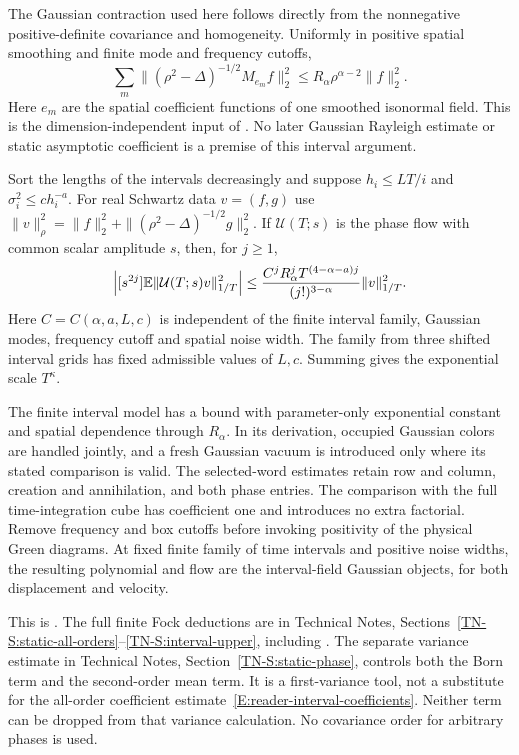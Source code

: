 The Gaussian contraction used here follows directly from the nonnegative
positive-definite covariance and homogeneity. Uniformly in positive spatial
smoothing and finite mode and frequency cutoffs,
\[
  \sum_m\|(\rho^2-\Delta)^{-1/2}M_{e_m}f\|_2^2
  \le R_\alpha\rho^{\alpha-2}\|f\|_2^2.
\]
Here $e_m$ are the spatial coefficient functions of one smoothed isonormal
field. This is the dimension-independent input of
. No later Gaussian Rayleigh estimate or
static asymptotic coefficient is a premise of this interval argument.

\begin{lemma}
  \label{L:reader-finite-upper}
  Sort the lengths of the intervals decreasingly and suppose $h_i \le LT/i$ and
  $\sigma_i^2 \le c h_i^{-a}$. For real Schwartz data $v = (f,g)$ use
  $\|v\|_\rho^2 = \|f\|_2^2+\|(\rho^2-\Delta)^{-1/2}g\|_2^2$. If
  $\mathcal{U}(T;s)$ is the phase flow with common scalar amplitude $s$, then,
  for $j \ge 1$,
  \begin{equation}\label{E:reader-interval-coefficients}
    \left|[s^{2j}]\mathbb E\|\mathcal{U}(T;s)v\|_{1/T}^2\right|
    \le\frac{C^jR_\alpha^jT^{(4-\alpha-a)j}}{(j!)^{3-\alpha}}
    \|v\|_{1/T}^2.
  \end{equation}
  Here $C = C(\alpha,a,L,c)$ is independent of the finite interval family,
  Gaussian modes, frequency cutoff and spatial noise width. The family from
  three shifted interval grids has fixed admissible values of $L,c$. Summing
  gives the exponential scale $T^\kappa$.

  The finite interval model has a bound with parameter-only exponential constant
  and spatial dependence through $R_\alpha$. In its derivation, occupied
  Gaussian colors are handled jointly, and a fresh Gaussian vacuum is introduced
  only where its stated comparison is valid. The selected-word estimates retain
  row and column, creation and annihilation, and both phase entries. The
  comparison with the full time-integration cube has coefficient one and
  introduces no extra factorial. Remove frequency and box cutoffs before
  invoking positivity of the physical Green diagrams. At fixed finite family of
  time intervals and positive noise widths, the resulting polynomial and flow
  are the interval-field Gaussian objects, for both displacement and velocity.
\end{lemma}

This is . The full finite Fock
deductions are in Technical Notes,
Sections~\ref{TN-S:static-all-orders}--\ref{TN-S:interval-upper}, including
. The separate variance estimate in Technical
Notes, Section~\ref{TN-S:static-phase}, controls both the Born term and the
second-order mean term.
It is a first-variance tool, not a substitute for the all-order coefficient
estimate~\eqref{E:reader-interval-coefficients}. Neither term can be dropped
from that variance calculation. No covariance order for arbitrary phases is
used.

